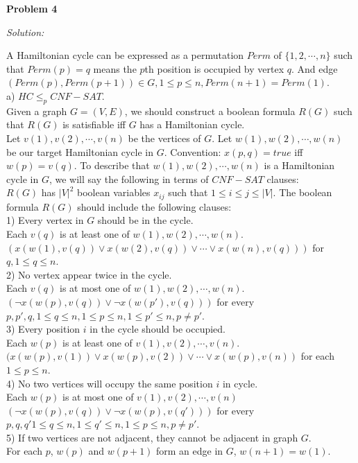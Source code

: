 \documentclass[12pt,letterpaper]{article}
\def\pp{\par\noindent}
\newcommand{\problem}[1]{ \bigskip \pp \textbf{Problem #1}\par}
\newcommand{\solution}{\textit{Solution:}\par}
\begin{document}
\problem{4}
\solution
A Hamiltonian cycle can be expressed as a permutation $Perm$ of $\{1,2,\cdots,n\}$
such that $Perm(p) = q$ means the $p$th position is occupied by vertex $q$.
And edge $(Perm(p),Perm(p+1)) \in G, 1 \le p \le n, Perm(n + 1) = Perm(1)$. \\
a) $HC \le_{p} CNF-SAT$. \\
Given a graph $G=(V,E)$, we should construct a boolean formula $R(G)$ such that $R(G)$ is satisfiable iff $G$ has a Hamiltonian cycle. \\
Let $v(1),v(2),\cdots,v(n)$ be the vertices of $G$.
Let $w(1),w(2),\cdots,w(n)$ be our target Hamiltonian cycle in $G$.
Convention: $x(p,q)=true$ iff $w(p) = v(q)$.
To describe that $w(1),w(2),\cdots,w(n)$ is a Hamiltonian cycle in $G$, we will say the following in terms of $CNF-SAT$ clauses: \\
$R(G)$ has $|V|^2$ boolean variables $x_{ij}$ such that $1 \le i \le j \le |V|$.
The boolean formula $R(G)$ should include the following clauses: \\
1) Every vertex in $G$ should be in the cycle. \\
Each $v(q)$ is at least one of $w(1), w(2), \cdots , w(n)$. \\
$(x(w(1),v(q)) \vee x(w(2),v(q)) \vee \cdots \vee x(w(n),v(q)))$ for $q, 1 \le q \le n$. \\
2) No vertex appear twice in the cycle. \\
Each $v(q)$ is at most one of $w(1), w(2), \cdots , w(n)$. \\
$(\neg x(w(p),v(q)) \vee \neg x(w(p'),v(q)))$ for every $p,p',q, 1 \le q \le n, 1 \le p \le n, 1\le p' \le n, p \neq p'$. \\
3) Every position $i$ in the cycle should be occupied. \\
Each $w(p)$ is at least one of $v(1),v(2),\cdots,v(n)$. \\
$(x(w(p),v(1)) \vee x(w(p),v(2)) \vee \cdots \vee x(w(p),v(n))$ for each $1 \le p \le n$. \\
4) No two vertices will occupy the same position $i$ in cycle. \\
Each $w(p)$ is at most one of $v(1), v(2), \cdots, v(n)$ \\
$(\neg x(w(p),v(q)) \vee \neg x(w(p),v(q')))$ for every $p,q,q' 1 \le q \le n, 1 \le q' \le n, 1\le p \le n, p \neq p'$. \\
5) If two vertices are not adjacent, they cannot be adjacent in graph $G$. \\
For each $p$, $w(p)$ and $w(p+1)$ form an edge in $G$, $w(n+1) = w(1)$. \\
\end{document}
